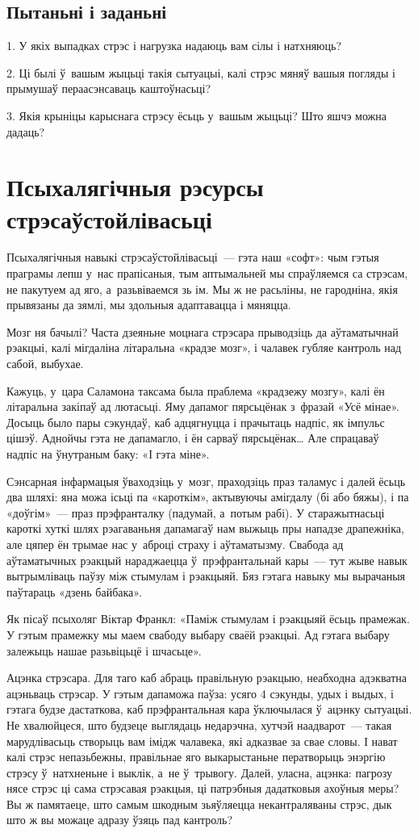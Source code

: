 \subsection*{Пытаньні і заданьні}

1. У якіх выпадках стрэс і нагрузка надаюць вам сілы і натхняюць?

2. Ці былі ў~вашым жыцьці такія сытуацыі, калі стрэс мяняў вашыя погляды і прымушаў пераасэнсаваць каштоўнасьці?

3. Якія крыніцы карыснага стрэсу ёсьць у~вашым жыцьці? Што яшчэ можна дадаць?


\section{Псыхалягічныя рэсурсы стрэсаўстойлівасьці}

Псыхалягічныя навыкі стрэсаўстойлівасьці~--- гэта наш «софт»: чым гэтыя праграмы лепш у~нас прапісаныя, тым аптымальней мы спраўляемся са стрэсам, не пакутуем ад яго, а~разьвіваемся зь ім. Мы ж не расьліны, не гародніна, якія прывязаны да зямлі, мы здольныя адаптавацца і мяняцца.

Мозг ня бачылі? Часта дзеяньне моцнага стрэсара прыводзіць да аўтаматычнай рэакцыі, калі мігдаліна літаральна «крадзе мозг», і чалавек губляе кантроль над сабой, выбухае.

Кажуць, у~цара Саламона таксама была праблема «крадзежу мозгу», калі ён літаральна закіпаў ад лютасьці. Яму дапамог пярсьцёнак з~фразай «Усё мінае». Досыць было пары сэкундаў, каб адцягнуцца і прачытаць надпіс, як імпульс цішэў. Аднойчы гэта не дапамагло, і ён сарваў пярсьцёнак… Але спрацаваў надпіс на ўнутраным баку: «І гэта міне».

Сэнсарная інфармацыя ўваходзіць у~мозг, праходзіць праз таламус і далей ёсьць два шляхі: яна можа ісьці па «кароткім», актывуючы амігдалу (бі або бяжы), і па «доўгім»~--- праз прэфранталку (падумай, а~потым рабі). У старажытнасьці кароткі хуткі шлях рэагаваньня дапамагаў нам выжыць пры нападзе драпежніка, але цяпер ён трымае нас у~аброці страху і аўтаматызму. Свабода ад аўтаматычных рэакцый нараджаецца ў~прэфрантальнай кары~--- тут жыве навык вытрымліваць паўзу між стымулам і рэакцыяй. Бяз гэтага навыку мы вырачаныя паўтараць «дзень байбака».

Як пісаў псыхоляг Віктар Франкл: «Паміж стымулам і рэакцыяй ёсьць прамежак. У гэтым прамежку мы маем свабоду выбару сваёй рэакцыі. Ад гэтага выбару залежыць нашае разьвіцьцё і шчасьце».

Ацэнка стрэсара. Для таго каб абраць правільную рэакцыю, неабходна адэкватна ацэньваць стрэсар. У гэтым дапаможа паўза: усяго 4 сэкунды, удых і выдых, і гэтага будзе дастаткова, каб прэфрантальная кара ўключылася ў~ацэнку сытуацыі. Не хвалюйцеся, што будзеце выглядаць недарэчна, хутчэй наадварот~--- такая марудлівасьць створыць вам імідж чалавека, які адказвае за свае словы. І нават калі стрэс непазьбежны, правільнае яго выкарыстаньне ператворыць энэргію стрэсу ў~натхненьне і выклік, а~не ў~трывогу. Далей, уласна, ацэнка: пагрозу нясе стрэс ці сама стрэсавая рэакцыя, ці патрэбныя дадатковыя ахоўныя меры? Вы ж памятаеце, што самым шкодным зьяўляецца некантраляваны стрэс, дык што ж вы можаце адразу ўзяць пад кантроль?


